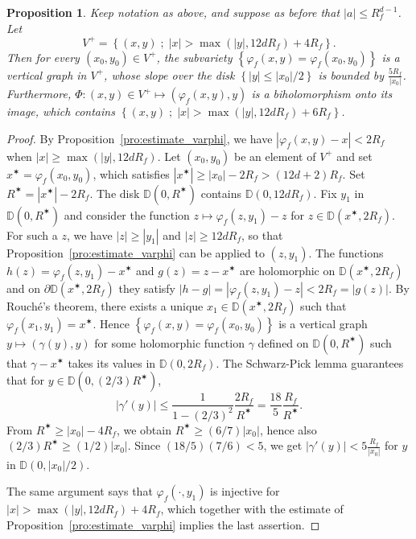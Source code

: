 \documentclass[oneside, 12pt]{amsart}
\newcommand{\disk}{\mathbb{D}}
\newcommand{\set}[1]{\left\{#1\right\}}
\newcommand{\abs}[1]{\left\vert#1\right\vert}
\theoremstyle{plain}
\newtheorem{pro}[thm]{Proposition}
\theoremstyle{definition}
\numberwithin{equation}{section}       %
\numberwithin{equation}{section}       %
\begin{document}
\begin{pro}\label{pro:slope}
Keep  notation as above, and suppose as before  that $\abs{a}\leq R_f^{d-1 }$. 
Let  
\[
V^+ = \set{(x,y)\; ; \;   \abs{x}> \max(\abs{y}, 12dR_f)+4R_f}.
\]
Then for every 
$(x_0, y_0)\in V^+$, the subvariety $\set{\varphi_f(x,y) = \varphi_f(x_0,y_0)}$ is a vertical graph in $V^+$, whose slope over the disk
$\set{\abs{y}\leq \abs{x_0}/2}$
is bounded by %
$\frac{5R_f}{\abs{x_0}}$.
Furthermore, $\Phi: (x,y)\in V^+\mapsto (\varphi_f(x,y), y)$ is a biholomorphism onto its image, which contains 
$\set{(x,y) \; ; \;   \abs{x}> \max(\abs{y}, 12dR_f)+6R_f}$.
\end{pro}

\begin{proof}
By Proposition~\ref{pro:estimate_varphi}, we have 
$\abs{\varphi_f(x,y)- x}< 2R_f$ when $\abs{x}\geq \max(\abs{y}, 12dR_f)$.  
Let $(x_0, y_0)$ be an element of $V^+$ and set $x^\varstar =  \varphi_f(x_0,y_0)$, 
which satisfies $\abs{x^\varstar} \geq \abs{x_0} - 2R_f > (12d+2)R_f$. 
 Set $R^\varstar=  \abs{x^\varstar}-2R_f$.
The disk $\disk(0,R^\varstar)$
contains $\disk(0, 12dR_f)$.
Fix $y_1$ in $\disk(0, R^\varstar)$  
and consider the function 
$z\mapsto \varphi_f(z, y_1) - z$ for  
$z\in \disk(x^\varstar, 2R_f)$.
For such a $z$, we have $\abs{z}\geq \abs{y_1}$ and $\abs{z}\geq 12dR_f$, so that Proposition~\ref{pro:estimate_varphi} can be applied to $(z,y_1)$. 
 The functions $h(z)=\varphi_f(z, y_1) - x^\varstar$ and $g(z)=z - x^\varstar$ are holomorphic on $\disk(x^\varstar, 2R_f)$ 
 and on $\partial\disk(x^\varstar, 2R_f)$ they satisfy  $\abs{h-g}=\abs{\varphi_f(z, y_1) - z}<2R_f=\abs{g(z)}$.
 By Rouché's theorem, there exists a unique $x_1\in \disk(x^\varstar, 2R_f)$
 such that  $\varphi_f(x_1,y_1) = x^\varstar$. Hence 
 $\set{\varphi_f(x,y) = \varphi_f(x_0,y_0)}$ is a vertical graph $y\mapsto (\gamma(y),y)$ for some holomorphic function $\gamma$
 defined on $\disk(0, R^\varstar)$ such that $\gamma-x^\varstar$ takes its
 values in $\disk(0, 2R_f)$.  The Schwarz-Pick lemma guarantees that for $y\in \disk(0, (2/3)R^\varstar)$,
 \[
\abs{\gamma'(y)} \leq \frac{1}{1-(2/3)^2} \frac{2R_f}{R^\varstar} = \frac{18}{5}  \frac{R_f}{R^\varstar}. 
\] 
From $R^\varstar \geq \abs{x_0}- 4R_f$, we obtain $R^\varstar\geq (6/7)\abs{x_0}$, 
hence also $(2/3)R^\varstar\geq (1/2)\abs{x_0}$. 
Since $(18/5)(7/6)< 5$, we get
$\abs{\gamma'(y)} < 5 \frac{R_f}{\abs{x_0}}$ for $y$ in $\disk(0, \abs{x_0}/2)$.

 
 
 The same argument says that $ \varphi_f(\cdot, y_1)$ is injective 
 for $\abs{x}> \max(\abs{y}, 12dR_f) + 4R_f$, which together with the estimate of 
 Proposition~\ref{pro:estimate_varphi}  implies the last assertion.
\end{proof}
\end{document}
